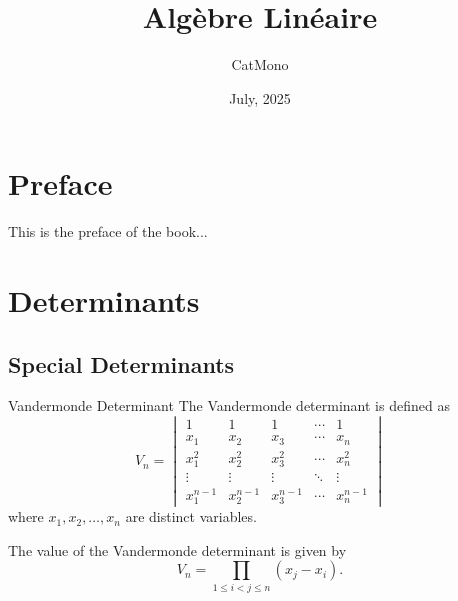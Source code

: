 \documentclass[11pt]{../../TexTemplate/elegantbook} %
\title{Algèbre Linéaire} %
\author{CatMono} %
\date{July, 2025} %
\begin{document}
\maketitle %

\frontmatter        %
\tableofcontents    %

\chapter{Preface}   %
This is the preface of the book...

\mainmatter         %

\chapter{Determinants} %
\section{Special Determinants} %
\begin{definition}{Vandermonde Determinant}
    The Vandermonde determinant is defined as
    \[
    V_n = \begin{vmatrix}
    1 & 1 & 1 & \cdots & 1 \\
    x_1 & x_2 & x_3 & \cdots & x_n \\
    x_1^2 & x_2^2 & x_3^2 & \cdots & x_n^2 \\
    \vdots & \vdots & \vdots & \ddots & \vdots \\
    x_1^{n-1} & x_2^{n-1} & x_3^{n-1} & \cdots & x_n^{n-1}
    \end{vmatrix}
    \]
    where \( x_1, x_2, \ldots, x_n \) are distinct variables.
\end{definition}

The value of the Vandermonde determinant is given by
\[
V_n = \prod_{1 \leq i < j \leq n} (x_j - x_i).
\]  
\end{document}
